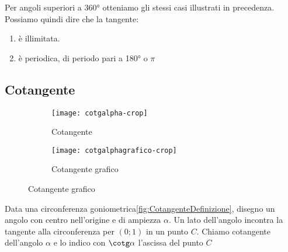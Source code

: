 Per angoli superiori a \ang{360} otteniamo gli stessi casi illustrati in precedenza. 
Possiamo quindi dire che la tangente:
\begin{enumerate}
	\item è illimitata.
	\item è periodica, di periodo pari a \ang{180} o $\pi$
\end{enumerate} 
\begin{figure}
	\centering

	\label{fig:AndamentoTangente1}
\end{figure}%
\begin{figure}
	\centering
	
\label{fig:AndamentoTangente2}
\end{figure}%
\subsection{Cotangente}
\label{sec:Cotangente}
\begin{figure}
	\begin{subfigure}[b]{.5\linewidth}
		\centering\texttt{[image: cotgalpha-crop]}
		\caption{Cotangente}\label{fig:CotangenteDefinizione}
	\end{subfigure}%
	\begin{subfigure}[b]{.5\linewidth}
		\centering\texttt{[image: cotgalphagrafico-crop]}
		\caption{Cotangente grafico}\label{fig:CotangenteGrafico}
	\end{subfigure}
	\label{tab:funzcotg}
\end{figure}
\begin{definizione}[Cotangente]
	Data una circonferenza goniometrica\nobs\vref{fig:CotangenteDefinizione}, disegno un angolo con centro nell'origine e di ampiezza $\alpha$. Un lato dell'angolo incontra la tangente  alla circonferenza  per $(0;1)$ in un punto $C$.  Chiamo cotangente dell'angolo $\alpha$ e lo indico con $\cotg\alpha$ l'ascissa  del punto $C$
\end{definizione}
